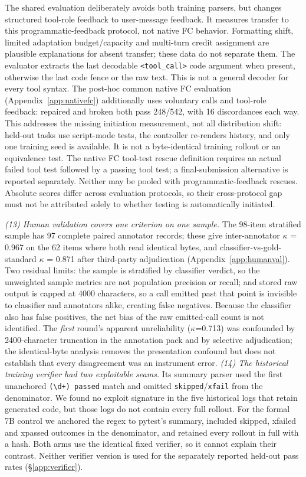 The shared evaluation deliberately avoids both training parsers, but changes structured tool-role
feedback to user-message feedback. It measures transfer to this programmatic-feedback protocol,
not native FC behavior. Formatting shift, limited adaptation budget/capacity and multi-turn
credit assignment are plausible explanations for absent transfer; these data do not separate them.
The evaluator extracts the last decodable \texttt{<tool\_call>} code argument when present,
otherwise the last code fence or the raw text. This is not a general decoder for every tool syntax.
The post-hoc common native FC evaluation (Appendix~\ref{app:nativefc}) additionally
uses voluntary calls and tool-role feedback: repaired and broken both pass 248/542,
with 16 discordances each way. This addresses the missing initiation measurement,
not all distribution shift: held-out tasks use script-mode tests, the controller
re-renders history, and only one training seed is available. It is not a byte-identical
training rollout or an equivalence test. The native FC tool-test rescue definition requires an actual
failed tool test followed by a passing tool test; a final-submission alternative is
reported separately. Neither may be pooled with programmatic-feedback rescues.
Absolute scores differ across evaluation protocols, so their cross-protocol gap
must not be attributed solely to whether testing is automatically initiated.


\emph{(13) Human validation covers one criterion on one sample.} The 98-item stratified sample has 97 complete paired annotator records; these give inter-annotator $\kappa$ = 0.967 on the 62 items where both read identical
bytes, and classifier-vs-gold-standard $\kappa$ = 0.871 after third-party adjudication
(Appendix~\ref{app:humanval}). Two residual limits: the sample is stratified by classifier
verdict, so the unweighted sample metrics are not population precision or recall; and stored raw
output is capped at 4000 characters, so a call emitted past that point is invisible to classifier
and annotators alike, creating false negatives. Because the classifier also has false positives,
the net bias of the raw emitted-call count is not identified. The \emph{first} round's apparent
unreliability ($\kappa$=0.713) was confounded by 2400-character truncation in the annotation
pack and by selective adjudication; the identical-byte analysis removes the presentation confound
but does not establish that every disagreement was an instrument error.
\emph{(14) The historical training verifier had two exploitable seams.} Its summary parser used
the first unanchored \texttt{(\textbackslash d+) passed} match and omitted
\texttt{skipped}/\texttt{xfail} from the denominator. We found no exploit signature in the five
historical logs that retain generated code, but those logs do not contain every full rollout. For
the formal 7B control we anchored the regex to pytest's summary, included skipped, xfailed and
xpassed outcomes in the denominator, and retained every rollout in full with a hash. Both arms use
the identical fixed verifier, so it cannot explain their contrast. Neither verifier version is
used for the separately reported held-out pass rates (\S\ref{app:verifier}).

